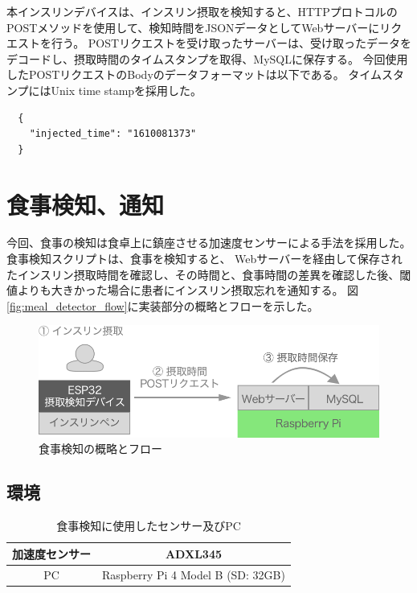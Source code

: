 本インスリンデバイスは、インスリン摂取を検知すると、HTTPプロトコルのPOSTメソッドを使用して、検知時間をJSONデータとしてWebサーバーにリクエストを行う。
POSTリクエストを受け取ったサーバーは、受け取ったデータをデコードし、摂取時間のタイムスタンプを取得、MySQLに保存する。
今回使用したPOSTリクエストのBodyのデータフォーマットは以下である。
タイムスタンプにはUnix time stampを採用した。

\begin{verbatim}
  {
    "injected_time": "1610081373"
  }
\end{verbatim}

\section{食事検知、通知}

今回、食事の検知は食卓上に鎮座させる加速度センサーによる手法を採用した。食事検知スクリプトは、食事を検知すると、
Webサーバーを経由して保存されたインスリン摂取時間を確認し、その時間と、食事時間の差異を確認した後、閾値よりも大きかった場合に患者にインスリン摂取忘れを通知する。
図\ref{fig:meal_detector_flow}に実装部分の概略とフローを示した。

\begin{figure}[htbp]
  \caption{食事検知の概略とフロー}
  \label{fig:insulin_injection_flow}
  \begin{center}
    \includegraphics[bb=0 0 1000 270,width=18cm]{assets/insulin_injection_flow.png}
  \end{center}
\end{figure}

\subsection{環境}

\begin{table}[htbp]
  \caption{食事検知に使用したセンサー及びPC}
  \label{tb:meal_detection_spec}
  \begin{center}
    \begin{tabular}{|c||c|}
      \hline
      加速度センサー & ADXL345 \\\hline
      PC & Raspberry Pi 4 Model B (SD: 32GB) \\\hline
    \end{tabular}
  \end{center}
\end{table}


